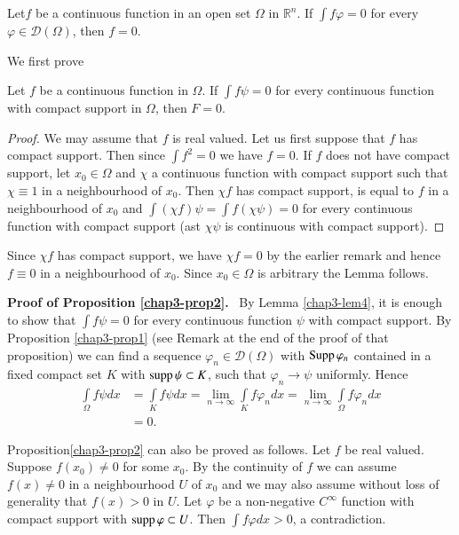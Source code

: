 \begin{proposition}\label{chap3-prop3}
Let\pageoriginale $f$ be a continuous function in an open set $\Omega$ in $\mathbb{R}^{n}$. If $\int f\varphi=0$ for every $\varphi \in \mathcal{D}(\Omega)$, then $f=0$.
\end{proposition}

We first prove

\begin{lemma}\label{chap3-lem4}
Let $f$ be a continuous function in $\Omega$. If $\int f\psi = 0$ for every continuous function with compact support in $\Omega$, then $F=0$.
\end{lemma}

\begin{proof}
We may assume that $f$ is real valued. Let us first suppose that $f$ has compact support. Then since $\int f^{2}=0$ we have $f=0$. If $f$ does not have compact support, let $x_{0}\in \Omega$ and $\chi$ a continuous function with compact support such that $\chi\equiv 1$ in a neighbourhood of $x_{0}$. Then $\chi f$ has compact support, is equal to $f$ in a neighbourhood of $x_{0}$ and $\int (\chi f)\psi =\int f(\chi \psi)=0$ for every continuous function with compact support (ast $\chi\psi$ is continuous with compact support).
\end{proof}

Since $\chi f$ has compact support, we have $\chi f=0$ by the earlier remark and hence $f\equiv 0$ in a neighbourhood of $x_{0}$. Since $x_{0}\in \Omega$ is arbitrary the Lemma follows.

\noindent
{\bf Proof of Proposition \ref{chap3-prop2}.}~ By Lemma \ref{chap3-lem4}, it is enough to show that $\int f\psi=0$ for every continuous function $\psi$ with compact support. By Proposition \ref{chap3-prop1} (see Remark at the end of the proof of that proposition) we can find a sequence $\varphi_{n}\in \mathcal{D}(\Omega)$ with $\operatorname{Supp} \varphi_{n}$ contained in a fixed compact set $K$ with $\operatorname{supp} \psi \subset K$, such that $\varphi_{n}\to \psi$ uniformly. Hence
\begin{align*}
\int\limits_{\Omega}f\psi dx &= \int\limits_{K}f\psi dx =\lim\limits_{n\to \infty}\int\limits_{K}f\varphi_{n}dx=\lim\limits_{n\to \infty}\int\limits_{\Omega}f\varphi_{n}dx\\[4pt]
&=0.
\end{align*}

\begin{remark*}
Proposition\pageoriginale \ref{chap3-prop2} can also be proved as follows. Let $f$ be real valued. Suppose $f(x_{0})\neq 0$ for some $x_{0}$. By the continuity of $f$ we can assume $f(x)\neq 0$ in a neighbourhood $U$ of $x_{0}$ and we may also assume without loss of generality that $f(x)>0$ in $U$. Let $\varphi$ be a non-negative $C^{\infty}$ function with compact support with $\operatorname{supp} \varphi\subset U$. Then $\int f\varphi dx>0$, a contradiction.
\end{remark*}


